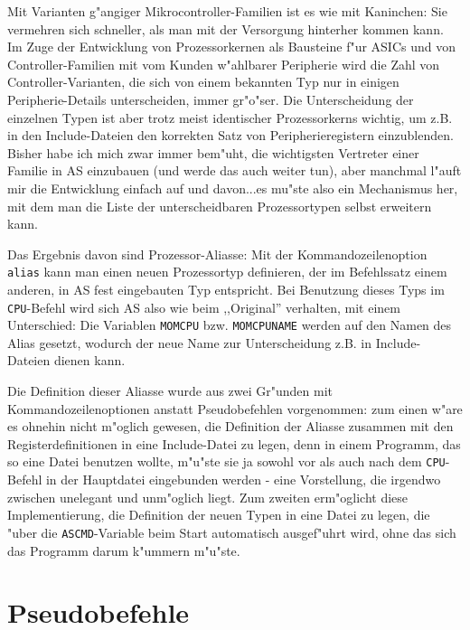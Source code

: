 \documentclass[12pt,a4paper,twoside]{report}
\newcommand{\tty}[1]{{\tt #1}}
\newcommand{\asname}{AS}
\begin{document}
Mit Varianten g"angiger Mikrocontroller-Familien ist es wie mit
Kaninchen: Sie vermehren sich schneller, als man mit der Versorgung
hinterher kommen kann.  Im Zuge der Entwicklung von Prozessorkernen als
Bausteine f"ur ASICs und von Controller-Familien mit vom Kunden w"ahlbarer
Peripherie wird die Zahl von Controller-Varianten, die sich von einem
bekannten Typ nur in einigen Peripherie-Details unterscheiden, immer
gr"o"ser.  Die Unterscheidung der einzelnen Typen ist aber trotz meist
identischer Prozessorkerns wichtig, um z.B. in den Include-Dateien den
korrekten Satz von Peripherieregistern einzublenden.  Bisher habe ich
mich zwar immer bem"uht, die wichtigsten Vertreter einer Familie in \asname{}
einzubauen (und werde das auch weiter tun), aber manchmal l"auft mir
die Entwicklung einfach auf und davon...es mu"ste also ein Mechanismus
her, mit dem man die Liste der unterscheidbaren Prozessortypen selbst
erweitern kann.
\par
Das Ergebnis davon sind Prozessor-Aliasse: Mit der Kommandozeilenoption \tty{alias}
kann man einen neuen Prozessortyp definieren, der im Befehlssatz einem
anderen, in \asname{} fest eingebauten Typ entspricht.  Bei Benutzung dieses
Typs im \tty{CPU}-Befehl wird sich \asname{} also wie beim ,,Original'' verhalten,
mit einem Unterschied: Die Variablen \tty{MOMCPU} bzw. \tty{MOMCPUNAME}
werden auf den Namen des Alias gesetzt, wodurch der neue Name zur
Unterscheidung z.B. in Include-Dateien dienen kann.
\par
Die Definition dieser Aliasse wurde aus zwei Gr"unden mit
Kommandozeilenoptionen anstatt Pseudobefehlen vorgenommen: zum einen
w"are es ohnehin nicht m"oglich gewesen, die Definition der Aliasse
zusammen mit den Registerdefinitionen in eine Include-Datei zu legen, denn
in einem Programm, das so eine Datei benutzen wollte, m"u"ste sie ja sowohl
vor als auch nach dem \tty{CPU}-Befehl in der Hauptdatei eingebunden
werden - eine Vorstellung, die irgendwo zwischen unelegant und unm"oglich
liegt.  Zum zweiten erm"oglicht diese Implementierung, die Definition der
neuen Typen in eine Datei zu legen, die "uber die \tty{ASCMD}-Variable beim
Start automatisch ausgef"uhrt wird, ohne das sich das Programm darum
k"ummern m"u"ste.


\cleardoublepage
\chapter{Pseudobefehle}
\end{document}
